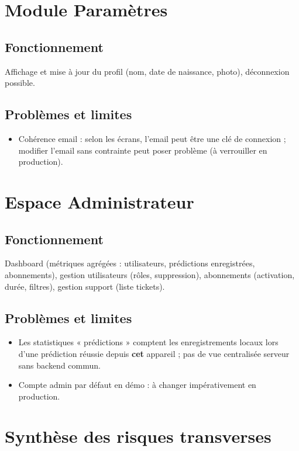\documentclass[12pt,a4paper,twoside,openright]{report}
\begin{document}
\section{Module Paramètres}

\subsection{Fonctionnement}
Affichage et mise à jour du profil (nom, date de naissance, photo), déconnexion possible.

\subsection{Problèmes et limites}
\begin{itemize}
  \item Cohérence email : selon les écrans, l'email peut être une clé de connexion ; modifier l'email sans contrainte peut poser problème (à verrouiller en production).
\end{itemize}

\section{Espace Administrateur}

\subsection{Fonctionnement}
Dashboard (métriques agrégées : utilisateurs, prédictions enregistrées, abonnements), gestion utilisateurs (rôles, suppression), abonnements (activation, durée, filtres), gestion support (liste tickets).

\subsection{Problèmes et limites}
\begin{itemize}
  \item Les statistiques « prédictions » comptent les enregistrements locaux lors d'une prédiction réussie depuis \textbf{cet} appareil ; pas de vue centralisée serveur sans backend commun.
  \item Compte admin par défaut en démo : à changer impérativement en production.
\end{itemize}

\section{Synthèse des risques transverses}
\end{document}
